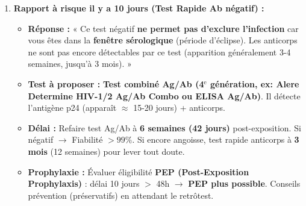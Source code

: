 \documentclass[11pt]{article}
\begin{document}
\begin{exoresolu}
\begin{enumerate}
    \item \textbf{Rapport à risque il y a 10 jours (Test Rapide Ab négatif) :}
    \begin{itemize}
        \item \textbf{Réponse :} « Ce test négatif \textbf{ne permet pas d'exclure l'infection} car vous êtes dans la \textbf{fenêtre sérologique} (période d'éclipse). Les anticorps ne sont pas encore détectables par ce test (apparition généralement 3-4 semaines, jusqu'à 3 mois). »
        \item \textbf{Test à proposer :} \textbf{Test combiné Ag/Ab (4$^{\text{e}}$ génération, ex: Alere Determine HIV-1/2 Ag/Ab Combo ou ELISA Ag/Ab)}. Il détecte l'antigène p24 (apparaît $\approx$ 15-20 jours) + anticorps.
        \item \textbf{Délai :} Refaire test Ag/Ab à \textbf{6 semaines (42 jours)} post-exposition. Si négatif $\rightarrow$ Fiabilité $> 99\%$. Si encore angoisse, test rapide anticorps à \textbf{3 mois} (12 semaines) pour lever tout doute.
        \item \textbf{Prophylaxie :} Évaluer éligibilité \textbf{PEP (Post-Exposition Prophylaxis)} : délai 10 jours $>$ 48h $\rightarrow$ \textbf{PEP plus possible}. Conseils prévention (préservatifs) en attendant le retrôtest.
    \end{itemize}
\end{enumerate}
\end{exoresolu}
\end{document}
